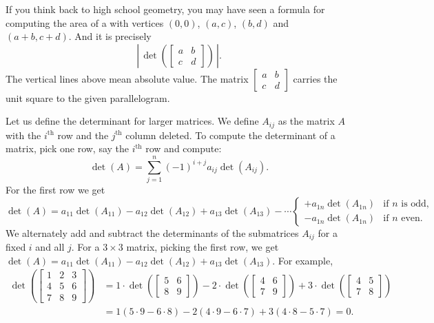 \documentclass[12pt]{book}
\begin{document}
If you think back to high school geometry, you may have seen a formula for
computing the area of a 
with vertices $(0,0)$, $(a,c)$, $(b,d)$
and $(a+b,c+d)$.  And it is precisely
\begin{equation*}
\left\lvert \, \det \left(
\begin{bmatrix} a & b \\ c & d \end{bmatrix}
\right) \, \right\lvert.
\end{equation*}
The vertical lines above mean absolute value.
The matrix $\left[ \begin{smallmatrix} a & b \\ c & d \end{smallmatrix}
\right]$
carries the unit square to the given parallelogram.

\medskip

Let us define the determinant for larger matrices.  We define $A_{ij}$ as
the matrix $A$ with the $i^{\text{th}}$ row and the $j^{\text{th}}$ column
deleted.  To compute the determinant of a matrix, pick one row, say the
$i^{\text{th}}$ row and compute:
\begin{equation*}
\boxed{~~
\det (A) =
\sum_{j=1}^n
{(-1)}^{i+j}
a_{ij} \det (A_{ij}) .
~~}
\end{equation*}
For the first row we get
\begin{equation*}
\det (A) =
a_{11} \det (A_{11}) - 
a_{12} \det (A_{12}) + 
a_{13} \det (A_{13}) - 
\cdots
\begin{cases}
+ a_{1n} \det (A_{1n}) & \text{if } n \text{ is odd,} \\
- a_{1n} \det (A_{1n}) & \text{if } n \text{ even.}
\end{cases}
\end{equation*}
We alternately add and subtract the determinants of the submatrices
$A_{ij}$ for a fixed $i$ and all $j$.  For a $3 \times 3$ matrix,
picking the first row, we get $\det (A) = a_{11} \det (A_{11}) -
a_{12} \det (A_{12}) + a_{13} \det (A_{13})$.  For example,
\begin{equation*}
\begin{split}
\det \left(
\begin{bmatrix}
1 & 2 & 3 \\
4 & 5 & 6 \\
7 & 8 & 9
\end{bmatrix}
\right)
& =
1 \cdot
\det \left(
\begin{bmatrix}
5 & 6 \\
8 & 9
\end{bmatrix}
\right)
-
2 \cdot
\det \left(
\begin{bmatrix}
4 & 6 \\
7 & 9
\end{bmatrix}
\right)
+
3 \cdot
\det \left(
\begin{bmatrix}
4 & 5 \\
7 & 8
\end{bmatrix}
\right) \\
& =
1 (5 \cdot 9 - 6 \cdot 8)
-
2 (4 \cdot 9 - 6 \cdot 7)
+
3 (4 \cdot 8 - 5 \cdot 7)
= 0 .
\end{split}
\end{equation*}
\end{document}
